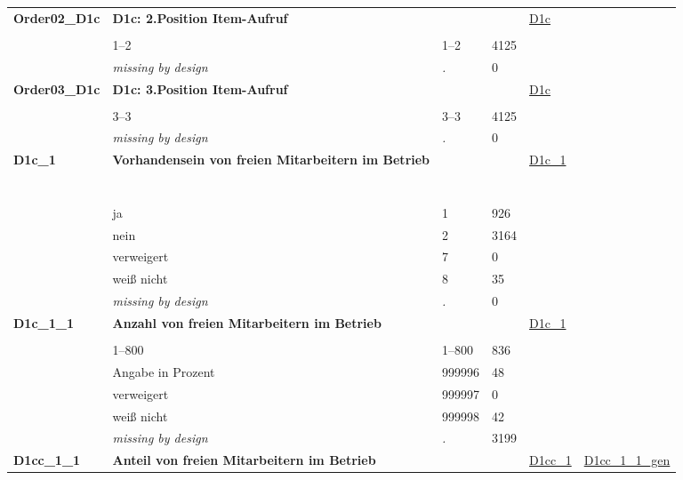 \begin{longtable}{| L{2.45cm} | L{6cm} | C{1.5cm} | R{1cm} | C{2.25cm} | C{2.25cm} |}
   \midrule
\textbf{Order02\_D1c}\label{var:Order02:D1c} & \textbf{D1c: 2.Position Item-Aufruf} &  &  & \hyperref[D1c]{D1c} & \hyperref[var:suf:]{} \\ 
   &  &  &  &  &  \\ 
   & 1--2 & 1--2 & 4125 &  &  \\ 
   & \textit{missing by design} & \textit{.} & 0 &  &  \\ 
   \midrule
\textbf{Order03\_D1c}\label{var:Order03:D1c} & \textbf{D1c: 3.Position Item-Aufruf} &  &  & \hyperref[D1c]{D1c} & \hyperref[var:suf:]{} \\ 
   &  &  &  &  &  \\ 
   & 3--3 & 3--3 & 4125 &  &  \\ 
   & \textit{missing by design} & \textit{.} & 0 &  &  \\ 
   \midrule
\textbf{D1c\_1}\label{var:D1c:1} & \textbf{Vorhandensein von freien Mitarbeitern im Betrieb} &  &  & \hyperref[D1c:1]{D1c\_1} & \hyperref[var:suf:]{} \\ 
   & \protect\subsection[Variablen D1c\_1 bis D5a]{} &  &  &  &  \\ 
   & ja & 1 & 926 &  &  \\ 
   & nein & 2 & 3164 &  &  \\ 
   & verweigert & 7 & 0 &  &  \\ 
   & weiß nicht & 8 & 35 &  &  \\ 
   & \textit{missing by design} & \textit{.} & 0 &  &  \\ 
   \midrule
\textbf{D1c\_1\_1}\label{var:D1c:1:1} & \textbf{Anzahl von freien Mitarbeitern im Betrieb} &  &  & \hyperref[D1c:1]{D1c\_1} & \hyperref[var:suf:]{} \\ 
   &  &  &  &  &  \\ 
   & 1--800 & 1--800 & 836 &  &  \\ 
   & Angabe in Prozent & 999996 & 48 &  &  \\ 
   & verweigert & 999997 & 0 &  &  \\ 
   & weiß nicht & 999998 & 42 &  &  \\ 
   & \textit{missing by design} & \textit{.} & 3199 &  &  \\ 
   \midrule
\textbf{D1cc\_1\_1}\label{var:D1cc:1:1} & \textbf{Anteil von freien Mitarbeitern im Betrieb} &  &  & \hyperref[D1cc:1]{D1cc\_1} & \hyperref[var:suf:D1cc:1:1:gen]{D1cc\_1\_1\_gen} \\ 

\end{longtable}
